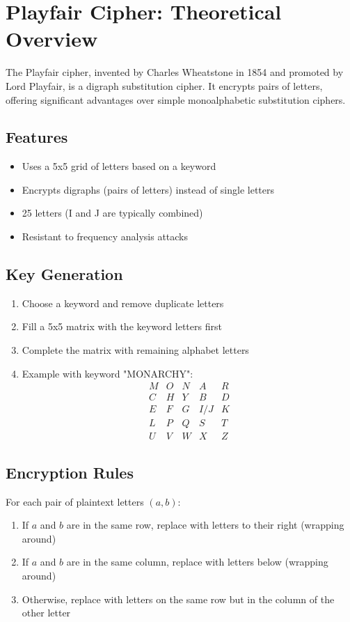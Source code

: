 \documentclass[12pt,a4paper]{article}
\begin{document}
\section*{Playfair Cipher: Theoretical Overview}

The Playfair cipher, invented by Charles Wheatstone in 1854 and promoted by Lord Playfair, is a digraph substitution cipher. It encrypts pairs of letters, offering significant advantages over simple monoalphabetic substitution ciphers.

\subsection*{Features}
\begin{itemize}
    \item Uses a 5x5 grid of letters based on a keyword
    \item Encrypts digraphs (pairs of letters) instead of single letters
    \item 25 letters (I and J are typically combined)
    \item Resistant to frequency analysis attacks
\end{itemize}

\subsection*{Key Generation}
\begin{enumerate}
    \item Choose a keyword and remove duplicate letters
    \item Fill a 5x5 matrix with the keyword letters first
    \item Complete the matrix with remaining alphabet letters
    \item Example with keyword "MONARCHY":
    \[
    \begin{matrix}
    M & O & N & A & R \\
    C & H & Y & B & D \\
    E & F & G & I/J & K \\
    L & P & Q & S & T \\
    U & V & W & X & Z
    \end{matrix}
    \]
\end{enumerate}

\subsection*{Encryption Rules}
For each pair of plaintext letters $(a,b)$:
\begin{enumerate}
    \item If $a$ and $b$ are in the same row, replace with letters to their right (wrapping around)
    \item If $a$ and $b$ are in the same column, replace with letters below (wrapping around)
    \item Otherwise, replace with letters on the same row but in the column of the other letter
\end{enumerate}
\end{document}

